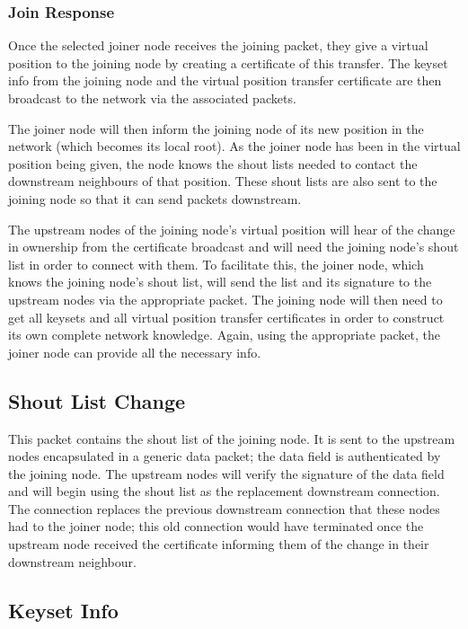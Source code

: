 \documentclass[ %
                    author={Luke Murray},
                supervisor={Dr. Simon Hollis},
                     title={Shadow Peer-to-Peer Networks},
                  subtitle={},
                    degree={MEng},
                      year={2013} ]{thesis}
\begin{document}
\subsubsection{Join Response}

Once the selected joiner node receives the joining packet, they give a virtual position to the joining node by creating a certificate of this transfer. The keyset info from the joining node and the virtual position transfer certificate are then broadcast to the network via the associated packets.

The joiner node will then inform the joining node of its new position in the network (which becomes its local root). As the joiner node has been in the virtual position being given, the node knows the shout lists needed to contact the downstream neighbours of that position. These shout lists are also sent to the joining node so that it can send packets downstream.

The upstream nodes of the joining node's virtual position will hear of the change in ownership from the certificate broadcast and will need the joining node's shout list in order to connect with them. To facilitate this, the joiner node, which knows the joining node's shout list, will send the list and its signature to the upstream nodes via the appropriate packet. The joining node will then need to get all keysets and all virtual position transfer certificates in order to construct its own complete network knowledge. Again, using the appropriate packet, the joiner node can provide all the necessary info.

\subsection{Shout List Change}

This packet contains the shout list of the joining node. It is sent to the upstream nodes encapsulated in a generic data packet; the data field is authenticated by the joining node. The upstream nodes will verify the signature of the data field and will begin using the shout list as the replacement downstream connection. The connection replaces the previous downstream connection that these nodes had to the joiner node; this old connection would have terminated once the upstream node received the certificate informing them of the change in their downstream neighbour.

\subsection{Keyset Info}
\end{document}
